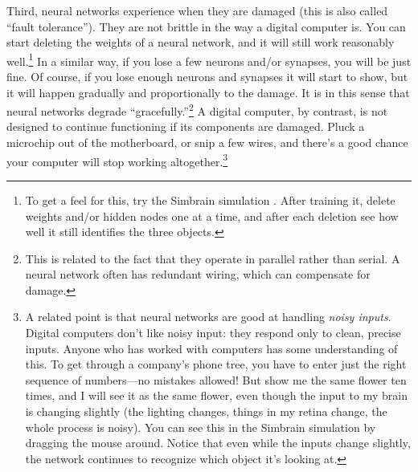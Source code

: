 Third, neural networks experience  when they are damaged (this is also called ``fault tolerance''). They are not brittle in the way a digital computer is. You can start deleting the weights of a neural network, and it will still work reasonably well.\footnote{To get a feel for this, try the Simbrain simulation . After training it, delete weights and/or hidden nodes one at a time, and after each deletion see how well it still identifies the three objects.} In a  similar way, if you lose a few neurons and/or synapses, you will be just fine. Of course, if you lose enough neurons and synapses it will start to show, but it will happen gradually and  proportionally to the damage. It is in this sense that neural networks degrade ``gracefully.''\footnote{This is related to the fact that they operate in parallel rather than serial. A neural network often has redundant wiring, which can compensate for damage.}  A digital computer, by contrast, is not designed to continue functioning if its components are damaged. Pluck a microchip out of the motherboard, or snip a few wires, and there's a good chance your computer will stop working altogether.\footnote{A related point is that neural networks are good at handling \emph{noisy inputs}. Digital computers don't like noisy input: they respond only to clean, precise inputs. Anyone who has worked with computers has some understanding of this. To get through a company's phone tree, you have to enter just the right sequence of numbers---no mistakes allowed!  But show me the same flower ten times, and I will see it as the same flower, even though the input to my brain is changing slightly (the lighting changes, things in my retina change, the whole process is noisy). You can see this in the Simbrain simulation by dragging the mouse around. Notice that even while the inputs change slightly, the network continues to recognize which object it's looking at.}

